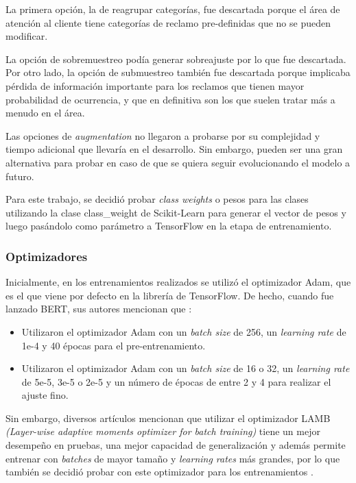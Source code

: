 La primera opción, la de reagrupar categorías, fue descartada porque el área de atención al cliente tiene categorías de reclamo pre-definidas que no se pueden modificar.

La opción de sobremuestreo podía generar sobreajuste por lo que fue descartada. Por otro lado, la opción de submuestreo también fue descartada porque implicaba pérdida de información importante para los reclamos que tienen mayor probabilidad de ocurrencia, y que en definitiva son los que suelen tratar más a menudo en el área.

Las opciones de \textit{augmentation} no llegaron a probarse por su complejidad y tiempo adicional que llevaría en el desarrollo. Sin embargo, pueden ser una gran alternativa para probar en caso de que se quiera seguir evolucionando el modelo a futuro.

Para este trabajo, se decidió probar \textit{class weights} o pesos para las clases utilizando la clase class\_weight de Scikit-Learn para generar el vector de pesos y luego pasándolo como parámetro a TensorFlow en la etapa de entrenamiento.

\subsubsection{Optimizadores}

Inicialmente, en los entrenamientos realizados se utilizó el optimizador Adam, que es el que viene por defecto en la librería de TensorFlow. De hecho, cuando fue lanzado BERT, sus autores mencionan que \citep{ARTICLE:8}:
\begin{itemize}
	\item Utilizaron el optimizador Adam con un \textit{batch size} de 256, un \textit{learning rate} de 1e-4 y 40 épocas para el pre-entrenamiento.
	\item Utilizaron el optimizador Adam con un \textit{batch size} de 16 o 32, un \textit{learning rate} de 5e-5, 3e-5 o 2e-5 y un número de épocas de entre 2 y 4 para realizar el ajuste fino.
\end{itemize}

Sin embargo, diversos artículos mencionan que utilizar el optimizador LAMB \textit{(Layer-wise adaptive moments optimizer for batch training)} tiene un mejor desempeño en pruebas, una mejor capacidad de generalización y además permite entrenar con \textit{batches} de mayor tamaño y \textit{learning rates} más grandes, por lo que también se decidió probar con este optimizador para los entrenamientos \citep{ARTICLE:9} \citep{WEBSITE:26}.

